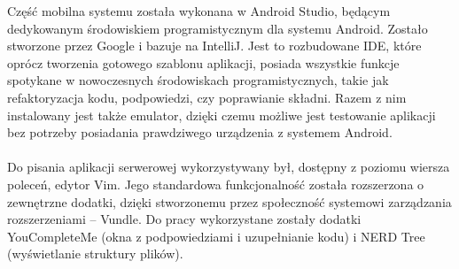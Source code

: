 Część mobilna systemu została wykonana w Android Studio, będącym dedykowanym środowiskiem programistycznym dla systemu Android. Zostało stworzone przez Google i bazuje na IntelliJ. Jest to rozbudowane IDE, które oprócz tworzenia gotowego szablonu aplikacji, posiada wszystkie funkcje spotykane w nowoczesnych środowiskach programistycznych, takie jak refaktoryzacja kodu, podpowiedzi, czy poprawianie składni. Razem z nim instalowany jest także emulator, dzięki czemu możliwe jest testowanie aplikacji bez potrzeby posiadania prawdziwego urządzenia z systemem Android.
\\
\\
Do pisania aplikacji serwerowej wykorzystywany był, dostępny z poziomu wiersza poleceń, edytor Vim. Jego standardowa funkcjonalność została rozszerzona o zewnętrzne dodatki, dzięki stworzonemu przez społeczność systemowi zarządzania rozszerzeniami -- Vundle. Do pracy wykorzystane zostały dodatki YouCompleteMe (okna z podpowiedziami i uzupełnianie kodu) i NERD Tree (wyświetlanie struktury plików).